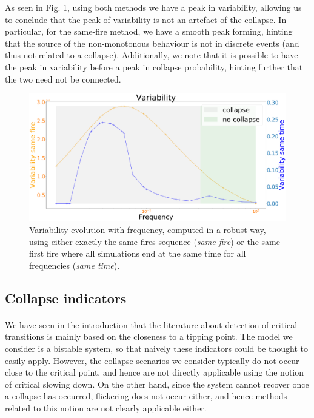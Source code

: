 \documentclass{article}
\begin{document}
As seen in Fig. \ref{fig:samefire}, using both methods we have a peak in variability, allowing us to conclude that the peak of variability is not an artefact of the collapse. In particular, for the same-fire method, we have a smooth peak forming, hinting that the source of the non-monotonous behaviour is not in discrete events (and thus not related to a collapse). Additionally, we note that it is possible to have the peak in variability before a peak in collapse probability, hinting further that the two need not be connected.

\begin{figure}[h]
\begin{center}
\includegraphics[width=12cm]{same_fire.png}
\end{center}
\caption{\label{fig:samefire}Variability evolution with frequency, computed in a robust way, using either exactly the same fires sequence (\textit{same fire}) or the same first fire where all simulations end at the same time for all frequencies (\textit{same time}).}
\end{figure}


\subsection{Collapse indicators}


\paragraph{}
We have seen in the \hyperref[def_detection]{introduction} that the literature about detection of critical transitions is mainly based on the closeness to a tipping point. The model we consider is a bistable system, so that naively these indicators could be thought to easily apply. However, the collapse scenarios we consider typically do not occur close to the critical point, and hence are not directly applicable using the notion of critical slowing down. On the other hand, since the system cannot recover once a collapse has occurred, flickering does not occur either, and hence methods related to this notion are not clearly applicable either.
\end{document}

